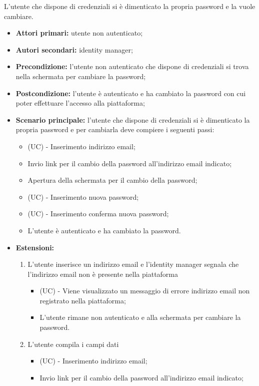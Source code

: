 L'utente che dispone di credenziali si è dimenticato la propria password e la vuole cambiare.
\begin{itemize}
    \item \textbf{Attori primari:} utente non autenticato;
    \item \textbf{Autori secondari:} identity manager;
    \item \textbf{Precondizione:} l'utente non autenticato che dispone di credenziali si trova nella schermata per cambiare la password;
    \item \textbf{Postcondizione:} l'utente è autenticato e ha cambiato la password con cui poter effettuare l'accesso alla piattaforma;
    \item \textbf{Scenario principale:} l'utente che dispone di credenziali si è dimenticato la propria password e per cambiarla deve compiere i seguenti passi:
    \begin{itemize}
        \item (UC) - Inserimento indirizzo email;
        \item Invio link per il cambio della password all'indirizzo email indicato;
        \item Apertura della schermata per il cambio della password;
        \item (UC) - Inserimento nuova password;
        \item (UC) - Inserimento conferma nuova password;
        \item L'utente è autenticato e ha cambiato la password.
    \end{itemize}
	\item \textbf{Estensioni:} 
	\begin{enumerate}
		\item L'utente inserisce un indirizzo email e l'identity manager segnala che l'indirizzo email non è presente nella piattaforma
		\begin{itemize}
			\item (UC) - Viene visualizzato un messaggio di errore indirizzo email non registrato nella piattaforma;
			\item L'utente rimane non autenticato e alla schermata per cambiare la password.
		\end{itemize}
		\item L'utente compila i campi dati
		\begin{itemize}
			\item (UC) - Inserimento indirizzo email;
			\item Invio link per il cambio della password all'indirizzo email indicato;

\end{itemize}
\end{enumerate}
\end{itemize}
